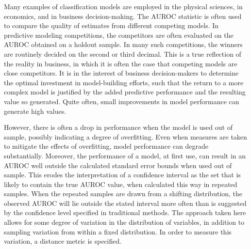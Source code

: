 
Many examples of classification models are employed in the physical sciences, in economics, and in business decision-making.
The AUROC statistic is often used to compare the quality of estimates from different competing models.
In predictive modeling competitions, the competitors are often evaluated on the AUROC obtained on a holdout sample.
In many such competitions, the winners are routinely decided on the second or third decimal.
This is a true reflection of the reality in business, in which it is often the case that competing models are close competitors.
It is in the interest of business decision-makers to determine the optimal investment in model-building efforts,
such that the return to a more complex model is justified by the added predictive performance and the resulting value so generated.
Quite often, small improvements in model performance can generate high values.


However, there is often a drop in performance when the model is used out of sample, possibly indicating a degree of overfitting.
Even when measures are taken to mitigate the effects of overfitting,
model performance can degrade substantially.
Moreover, the performance of a model, at first use, can result in an AUROC well outside the calculated standard error bounds when used out of sample.
This erodes the interpretation of a confidence interval as the set that is likely to contain the true AUROC value, when calculated this way in repeated samples.
When the repeated samples are drawn from a shifting distribution, the observed AUROC will lie outside the stated interval more often than is suggested by the confidence level specified in traditional methods.
The approach taken here allows for some degree of variation in the distribution of variables, in addition to sampling variation from within a fixed distribution.
In order to measure this variation, a distance metric is specified.



